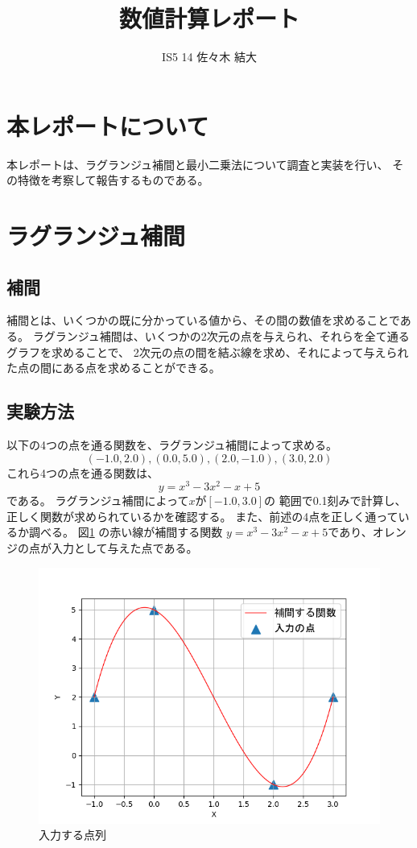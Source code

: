 \documentclass{jsarticle}
\begin{document}
\title{数値計算レポート}
\author{IS5 14 佐々木 結大}
\maketitle
\newpage
\tableofcontents
\newpage

\section{本レポートについて}
本レポートは、ラグランジュ補間と最小二乗法について調査と実装を行い、
その特徴を考察して報告するものである。
\section{ラグランジュ補間}
\subsection{補間}
補間とは、いくつかの既に分かっている値から、その間の数値を求めることである。
ラグランジュ補間は、いくつかの2次元の点を与えられ、それらを全て通るグラフを求めることで、
2次元の点の間を結ぶ線を求め、それによって与えられた点の間にある点を求めることができる。
\subsection{実験方法}
以下の4つの点を通る関数を、ラグランジュ補間によって求める。
\[
    (-1.0,2.0),
    (0.0,5.0),
    (2.0,-1.0),
    (3.0,2.0)
\] 
これら4つの点を通る関数は、
\[
    y=x^3-3x^2-x+5
\]
である。
ラグランジュ補間によって\(x\)が\([-1.0,3.0]\)の
範囲で0.1刻みで計算し、正しく関数が求められているかを確認する。
また、前述の4点を正しく通っているか調べる。
図\ref{fig:lag_ingraph} の赤い線が補間する関数
\(y=x^3-3x^2-x+5\)であり、オレンジの点が入力として与えた点である。

\begin{figure}[htbp]
    \begin{center}
    \includegraphics[width=0.5\hsize]{lag_in.png}
    \caption{入力する点列}\label{fig:lag_ingraph} 
    \end{center}
\end{figure}
\end{document}
